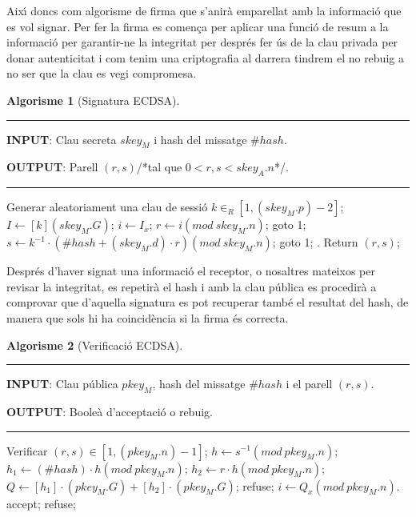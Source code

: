 \documentclass[12pt,twoside,catalan,a4paper]{book}%
\numberwithin{figure}{section}		%
\theoremstyle{definition}   			%
\theoremstyle{saltolinea}   			%
\newtheorem{algo}{Algorisme}
\begin{document}
Aix\'{\i} doncs com algorisme de firma que s'anir\`a emparellat amb la informaci\'o que es vol signar. Per fer la firma es comen\c{c}a per aplicar una funci\'o de resum a la informaci\'o per garantir-ne la integritat per despr\'es fer \'us de la clau privada per donar autenticitat i com tenim una criptografia al darrera tindrem el no rebuig a no ser que la clau es vegi compromesa.

\begin{table}[H]
\begin{algo}[Signatura ECDSA]\label{alg:ECDSA}
\parbox[b]{\linewidth}{%
\hrule
\smallskip
{\bf INPUT}: Clau secreta $skey_{M}$ i hash del missatge $\#hash$.

{\bf OUTPUT}: Parell $\left(r,s\right)$/{*}tal que $0<r,s<skey_{A}.n${*}/.
\vspace{1.5mm}
\hrule
}%
\begin{algorithmic}[1]
\STATE Generar aleatoriament una clau de sessi\'o $k\in_{R}\left[1,\left(skey_{M}.p\right)-2\right]$;
\STATE $I\leftarrow [k]\left(skey_{M}.G\right)$;
\STATE $i\leftarrow I_{x}$;
\STATE $r\leftarrow i\left(mod\: skey_{M}.n\right)$;
 \STATE goto 1; \ENDIF
\STATE $s\leftarrow k^{-1}\cdot\left(\# hash+\left(skey_{M}.d\right)\cdot r\right)\left(mod\: skey_{M}.n\right)$;
 \STATE goto 1; \ENDIF.
\STATE Return $(r,s)$;
\end{algorithmic}
\end{algo}%
\end{table}

Despr\'es d'haver signat una informaci\'o el receptor, o nosaltres mateixos per revisar la integritat, es repetir\`a el hash i amb la clau p\'ublica es procedir\`a a comprovar que d'aquella signatura es pot recuperar tamb\'e el resultat del hash, de manera que sols hi ha coincid\`encia si la firma \'es correcta.

\begin{table}[H]
\begin{algo}[Verificaci\'o ECDSA]\label{alg:ECDSA_verif}
\parbox[b]{\linewidth}{%
\hrule
\smallskip
{\bf INPUT}: Clau p\'ublica $pkey_{M}$, hash del missatge $\#hash$ i el parell $\left(r,s\right)$.

{\bf OUTPUT}: Boole\`a d'acceptaci\'o o rebuig.
\vspace{1.5mm}
\hrule
}%
\begin{algorithmic}[1]
\STATE Verificar $\left(r,s\right)\in\left[1,\left(pkey_{M}.n\right)-1\right]$;
\STATE $h\leftarrow s^{-1}\left(mod\: pkey_{M}.n\right)$;
\STATE $h_{1}\leftarrow\left(\# hash\right)\cdot h\left(mod\: pkey_{M}.n\right)$;
\STATE $h_{2}\leftarrow r\cdot h\left(mod\: pkey_{M}.n\right)$;
\STATE $Q\leftarrow \left[h_{1}\right]\cdot\left(pkey_{M}.G\right)+\left[h_{2}\right]\cdot\left(pkey_{M}.G\right)$;
 \STATE refuse; \ENDIF
\STATE $i\leftarrow Q_{x}\left(mod\: pkey_{M}.n\right)$.
 \STATE accept; \ELSE \STATE refuse; \ENDIF
\end{algorithmic}
\end{algo}%
\end{table}
\end{document}

